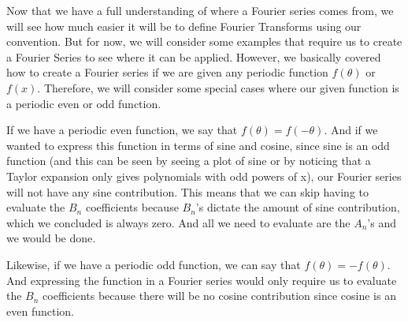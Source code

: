 \documentclass{article}
\begin{document}
Now that we have a full understanding of where a Fourier series comes from, we will see how much easier it will be to define Fourier Transforms using our convention.
But for now, we will consider some examples that require us to create a Fourier Series to see where it can be applied.
However, we basically covered how to create a Fourier series if we are given any periodic function $f(\theta)$ or $f(x)$.
Therefore, we will consider some special cases where our given function is a periodic even or odd function.

If we have a periodic even function, we say that $f(\theta) = f(- \theta)$.
And if we wanted to express this function in terms of sine and cosine, since sine is an odd function (and this can be seen by seeing a plot of sine or by noticing that a Taylor expansion only gives polynomials with odd powers of x), our Fourier series will not have any sine contribution.
This means that we can skip having to evaluate the $B_n$ coefficients because $B_n$'s dictate the amount of sine contribution, which we concluded is always zero.
And all we need to evaluate are the $A_n$'s and we would be done.

Likewise, if we have a periodic odd function, we can say that $f(\theta) = - f(\theta)$.
And expressing the function in a Fourier series would only require us to evaluate the $B_n$ coefficients because there will be no cosine contribution since cosine is an even function.
\end{document}
